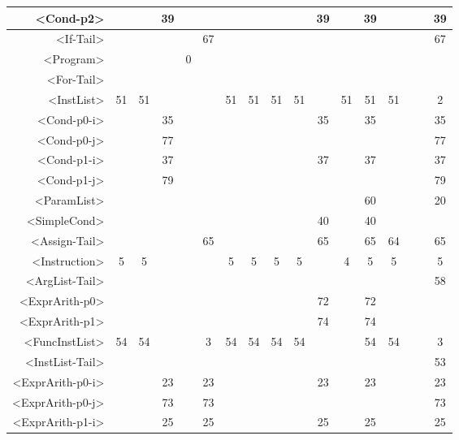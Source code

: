 \begin{tabular}{r|c@{ }c@{ }c@{ }c@{ }c@{ }c@{ }c@{ }c@{ }c@{ }c@{ }c@{ }c@{ }c@{ }c@{ }c@{ }c@{ }}
<Cond-p2> &   &   & 39 &   &   &   &   &   &   & 39 &   & 39 &   &   &   & 39 \\\hline
<If-Tail> &   &   &   &   & 67 &   &   &   &   &   &   &   &   &   &   & 67 \\\hline
<Program> &   &   &   & 0 &   &   &   &   &   &   &   &   &   &   &   &   \\\hline
<For-Tail> &   &   &   &   &   &   &   &   &   &   &   &   &   &   &   &   \\\hline
<InstList> & 51 & 51 &   &   &   & 51 & 51 & 51 & 51 &   & 51 & 51 & 51 &   &   & 2 \\\hline
<Cond-p0-i> &   &   & 35 &   &   &   &   &   &   & 35 &   & 35 &   &   &   & 35 \\\hline
<Cond-p0-j> &   &   & 77 &   &   &   &   &   &   &   &   &   &   &   &   & 77 \\\hline
<Cond-p1-i> &   &   & 37 &   &   &   &   &   &   & 37 &   & 37 &   &   &   & 37 \\\hline
<Cond-p1-j> &   &   & 79 &   &   &   &   &   &   &   &   &   &   &   &   & 79 \\\hline
<ParamList> &   &   &   &   &   &   &   &   &   &   &   & 60 &   &   &   & 20 \\\hline
<SimpleCond> &   &   &   &   &   &   &   &   &   & 40 &   & 40 &   &   &   &   \\\hline
<Assign-Tail> &   &   &   &   & 65 &   &   &   &   & 65 &   & 65 & 64 &   &   & 65 \\\hline
<Instruction> & 5 & 5 &   &   &   & 5 & 5 & 5 & 5 &   & 4 & 5 & 5 &   &   & 5 \\\hline
<ArgList-Tail> &   &   &   &   &   &   &   &   &   &   &   &   &   &   &   & 58 \\\hline
<ExprArith-p0> &   &   &   &   &   &   &   &   &   & 72 &   & 72 &   &   &   &   \\\hline
<ExprArith-p1> &   &   &   &   &   &   &   &   &   & 74 &   & 74 &   &   &   &   \\\hline
<FuncInstList> & 54 & 54 &   &   & 3 & 54 & 54 & 54 & 54 &   &   & 54 & 54 &   &   & 3 \\\hline
<InstList-Tail> &   &   &   &   &   &   &   &   &   &   &   &   &   &   &   & 53 \\\hline
<ExprArith-p0-i> &   &   & 23 &   & 23 &   &   &   &   & 23 &   & 23 &   &   &   & 23 \\\hline
<ExprArith-p0-j> &   &   & 73 &   & 73 &   &   &   &   &   &   &   &   &   &   & 73 \\\hline
<ExprArith-p1-i> &   &   & 25 &   & 25 &   &   &   &   & 25 &   & 25 &   &   &   & 25 \\\hline

\end{tabular}
